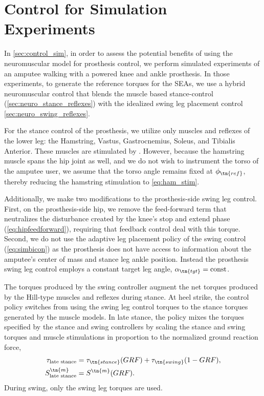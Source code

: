 \section{Control for Simulation Experiments}
In \cref{sec:control_sim}, in order to assess the potential benefits of using the
neuromuscular model for prosthesis control, we perform simulated experiments of
an amputee walking with a powered knee and ankle prosthesis. In those
experiments, to generate the reference torques for the SEAs, we use a hybrid
neuromuscular control that blends the muscle based stance-control
(\cref{sec:neuro_stance_reflexes}) with the idealized swing leg placement
control \cref{sec:neuro_swing_reflexes}. 

For the stance control of the prosthesis, we utilize only muscles and reflexes
of the lower leg: the Hamstring, Vastus, Gastrocnemius, Soleus, and Tibialis
Anterior. These muscles are stimulated by
. However, because the hamstring muscle
spans the hip joint as well, and we do not wish to instrument the torso of the
amputee user, we assume that the torso angle remains fixed at $\phi_\tn{ref}$, 
thereby reducing the hamstring stimulation to \cref{eq:ham_stim}.

Additionally, we make two modifications to the prosthesis-side swing leg
control. First, on the prosthesis-side hip, we remove the feed-forward term that
neutralizes the disturbance created by the knee's stop and extend phase
(\cref{eq:hipfeedforward}), requiring that feedback control deal with this
torque.  Second, we do not use the adaptive leg placement policy of the swing
control (\cref{eq:simbicon}) as the prosthesis does not have access to
information about the amputee's center of mass and stance leg ankle position.
Instead the prosthesis swing leg control employs a constant target leg angle,
$\alpha_\tn{tgt} = \mathrm{const}$.

The torques produced by the swing controller augment the net torques produced by
the Hill-type muscles and reflexes during stance. At heel strike, the control
policy switches from using the swing leg control torques to the stance torques
generated by the muscle models. In late stance, the policy mixes the torques
specified by the stance and swing controllers by scaling the stance and swing
torques and muscle stimulations in proportion to the normalized ground reaction
force,
\begin{align}
    \tau_\textrm{late stance} &= \tau_\tn{stance}(GRF) +
    \tau_\tn{swing}(1 - GRF), \label{eq:stance_grf_trans}\\ 
    S^\tn{m}_\textrm{late stance}  &= S^\tn{m}(GRF).\label{eq:swing_grf_trans}
\end{align}
During swing, only the swing leg torques are used.


